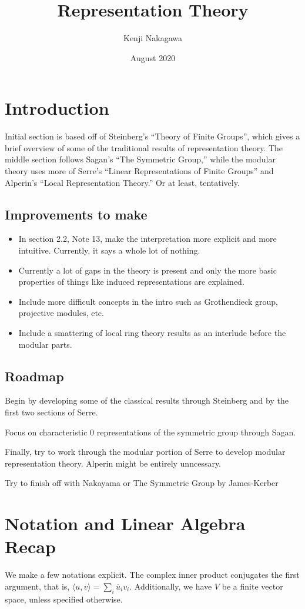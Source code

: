 \documentclass{article}
\title{Representation Theory}
\author{Kenji Nakagawa}
\date{August 2020}
\begin{document}
\maketitle
\tableofcontents

\section*{Introduction}
Initial section is based off of Steinberg's ``Theory of Finite Groups'', which gives a brief overview of some of the traditional results of representation theory. The middle section follows Sagan's ``The Symmetric Group,'' while the modular theory uses more of Serre's ``Linear Representations of Finite Groups'' and Alperin's ``Local Representation Theory.'' Or at least, tentatively.

\subsection{Improvements to make}
\begin{itemize}
    \item In section 2.2, Note 13, make the interpretation more explicit and more intuitive. Currently, it says a whole lot of nothing.
    \item Currently a lot of gaps in the theory is present and only the more basic properties of things like induced representations are explained.
    \item Include more difficult concepts in the intro such as Grothendieck group, projective modules, etc.
    \item Include a smattering of local ring theory results as an interlude before the modular parts.
\end{itemize}

\subsection{Roadmap}
Begin by developing some of the classical results through Steinberg and by the first two sections of Serre.

Focus on characteristic $0$ representations of the symmetric group through Sagan.

Finally, try to work through the modular portion of Serre to develop modular representation theory. Alperin might be entirely unncessary.

Try to finish off with Nakayama or The Symmetric Group by James-Kerber

\section{Notation and Linear Algebra Recap}
We make a few notations explicit. The complex inner product conjugates the first argument, that is, $\langle u, v \rangle = \sum_i \overline{u}_iv_i$. Additionally, we have $V$ be a finite vector space, unless specified otherwise.
\end{document}
